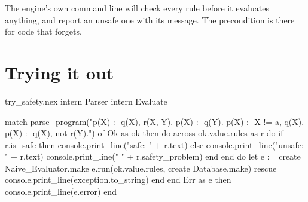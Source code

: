 The engine's own command line will check every rule before it evaluates
anything, and report an unsafe one with its message. The precondition is
there for code that forgets.

\section{Trying it out}

\begin{tryit}{try_safety.nex}
intern Parser
intern Evaluate

match parse_program("p(X) :- q(X), r(X, Y).
p(X) :- q(Y).
p(X) :- X != a, q(X).
p(X) :- q(X), not r(Y).") of
  Ok as ok then
    do
      across ok.value.rules as r do
        if r.is_safe then
          console.print_line("safe:    " + r.text)
        else
          console.print_line("unsafe:  " + r.text)
          console.print_line("         " + r.safety_problem)
        end
      end
      do
        let e := create Naive_Evaluator.make
        e.run(ok.value.rules, create Database.make)
      rescue
        console.print_line(exception.to_string)
      end
    end
  Err as e then console.print_line(e.error)
end
\end{tryit}
